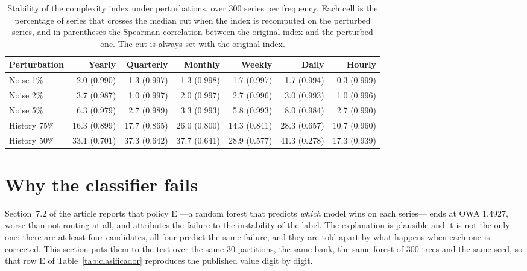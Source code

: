 \begin{table}[htbp]
\centering
\caption{Stability of the complexity index under perturbations, over 300 series per
frequency. Each cell is the percentage of series that crosses the median cut when the
index is recomputed on the perturbed series, and in parentheses the Spearman
correlation between the original index and the perturbed one. The cut is always set
with the original index.}
\label{tab:estabilidad}
\small
\setlength{\tabcolsep}{4.5pt}
\begin{tabular}{lrrrrrr}
\toprule
\textbf{Perturbation} & \textbf{Yearly} & \textbf{Quarterly} & \textbf{Monthly} & \textbf{Weekly} & \textbf{Daily} & \textbf{Hourly} \\
\midrule
Noise 1\% & 2.0 (0.990) & 1.3 (0.997) & 1.3 (0.998) & 1.7 (0.997) & 1.7 (0.994) & 0.3 (0.999) \\
Noise 2\% & 3.7 (0.987) & 1.0 (0.997) & 2.0 (0.997) & 2.7 (0.996) & 3.0 (0.993) & 1.0 (0.996) \\
Noise 5\% & 6.3 (0.979) & 2.7 (0.989) & 3.3 (0.993) & 5.8 (0.993) & 8.0 (0.984) & 2.7 (0.990) \\
\midrule
History 75\% & 16.3 (0.899) & 17.7 (0.865) & 26.0 (0.800) & 14.3 (0.841) & 28.3 (0.657) & 10.7 (0.960) \\
History 50\% & 33.1 (0.701) & 37.3 (0.642) & 37.7 (0.641) & 28.9 (0.577) & 41.3 (0.278) & 17.3 (0.939) \\
\bottomrule
\end{tabular}
\end{table}


\section{Why the classifier fails}\label{sec:clasificador}

Section~7.2 of the article reports that policy E ---a random forest that predicts
\emph{which} model wins on each series--- ends at OWA $1.4927$, worse than not routing at
all, and attributes the failure to the instability of the label. The explanation is
plausible and it is not the only one: there are at least four candidates, all four
predict the same failure, and they are told apart by what happens when each one is
corrected. This section puts them to the test over the same 30 partitions, the same
bank, the same forest of 300 trees and the same seed, so that row E of
Table~\ref{tab:clasificador} reproduces the published value digit by digit.

